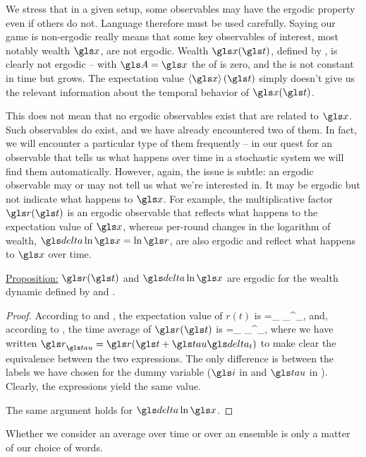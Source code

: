 We stress that in a given setup, some observables may have the ergodic property even
if others do not. Language therefore must be used carefully. Saying our game is non-ergodic
really means that some key observables of interest, most notably wealth $\x$, are
not ergodic. Wealth $\x(\t)$, defined by , is clearly not ergodic -- with $\A=\x$ the \LHS of  
is zero, and the \RHS is not constant in time but grows. The expectation value $\ave{\x}(\t)$
simply doesn't give us the relevant information about the temporal behavior of $\x(\t)$.
 
This does not mean that no ergodic observables exist that are related
to $\x$. Such observables do exist, and
we have already encountered two of them. In fact, we will encounter a particular type
of them frequently -- in our quest for an observable that tells us what happens over
time in a stochastic system we will find them automatically. However, again, the issue
is subtle: an ergodic observable may or may not tell  us what we're interested in.
It may be ergodic but not indicate what happens to $\x$. For example, 
the multiplicative factor $\gr(\t)$ is an 
ergodic observable that reflects what happens to the expectation value of $\x$, 
whereas per-round changes in the logarithm of wealth, $\d \ln \x = \ln \gr$, are also ergodic 
and reflect what happens to $\x$ over time.

\vspace{.3cm}
\underline{Proposition:} $\gr(\t)$ and $\d \ln \x$  are ergodic for the wealth dynamic defined by  and .

\begin{proof}

According to  and , the expectation value of $r(t)$ is
\be
\ave{\gr}=\lim_{\N\to\infty}  \sum_\gi^\N \gr_\gi,
\ee
and, according to , the time average of $\gr(\t)$ is
\be
\tave{\gr}=\lim_{\T\to\infty}  \sum_\gtau^\T \gr_\gtau,
\ee
where we have written $\gr_\gtau = \gr(\t+\gtau\dt)$ to make clear the equivalence between the two expressions. The only difference is between the labels we have chosen
for the dummy variable ($\gi$ in  and $\gtau$ in ). Clearly, the 
expressions yield the same value. 

The same argument holds for $\d \ln \x$.
\end{proof}

Whether we consider  an average over 
time or over an ensemble is only a matter of our choice of words. 

